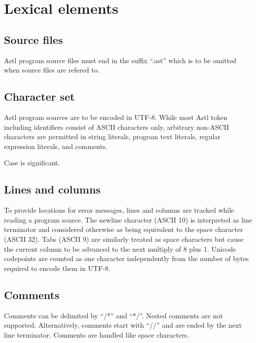 \chapter{Lexical elements}

\section{Source files}

Astl program source files must end in the
suffix ``.ast'' which is to be omitted when
source files are refered to.

\section{Character set}

Astl program sources are to be encoded in UTF-8. While most Astl
token including identifiers consist of ASCII characters only,
arbitrary non-ASCII characters are permitted in string literals,
program text literals, regular expression literals, and comments.

Case is significant.

\section{Lines and columns}

To provide locations for error messages,
lines and columns are tracked while reading a
program source. The newline character
(ASCII 10) is interpreted as line terminator
and considered otherwise as being equivalent to the space
character (ASCII 32). Tabs (ASCII 9) are similarly treated as
space characters but cause the current column to be advanced to the next
multiply of 8 plus 1. Unicode codepoints are counted as one character
independently from the number of bytes required to encode
them in UTF-8.

\section{Comments}

Comments can be delimited by ``/*'' and ``*/''. Nested comments
are not supported. Alternatively, comments start with ``//'' and
are ended by the next line terminator.
Comments are handled like space characters.


